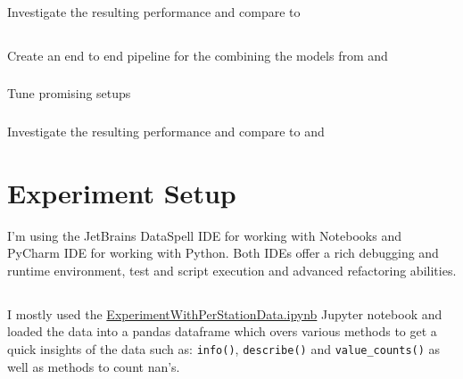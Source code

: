 \documentclass[a4paper]{article}
\begin{document}
    \subsubsection*{} Investigate the resulting performance and compare to 

    \subsection*{}
    \subsubsection*{} Create an end to end pipeline for the combining the models from  and 
    \subsubsection*{} Tune promising setups
    \subsubsection*{} Investigate the resulting performance and compare to  and 



    \section{Experiment Setup}\label{sec:experiment-setup}
    I'm using the JetBrains DataSpell IDE for working with Notebooks and PyCharm IDE for working with Python. Both IDEs offer
    a rich debugging and runtime environment, test and script execution and advanced refactoring abilities.

    \subsection*{}

    \subsubsection*{}
    I mostly used the
    \href{https://github.com/isabelladegen/mlp-2021/blob/main/notebooks/ExperimentWithPerStationData.ipynb}{ExperimentWithPerStationData.ipynb}
    Jupyter notebook and loaded the data into a pandas dataframe \cite{reback2020pandas} which overs various methods
    to get a quick insights of the data such as: \texttt{info()}, \texttt{describe()} and \texttt{value\_counts()} as well
    as methods to count nan's.
\end{document}
